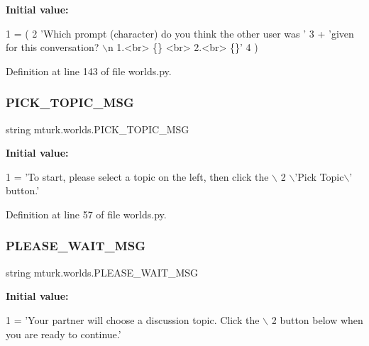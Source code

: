 {\bfseries Initial value\+:}
\begin{DoxyCode}
1 =  (
2     \textcolor{stringliteral}{'Which prompt (character) do you think the other user was '}
3     + \textcolor{stringliteral}{'given for this conversation?  \(\backslash\)n 1.<br> \{\} <br> 2.<br> \{\}'}
4 )
\end{DoxyCode}


Definition at line 143 of file worlds.\+py.

\mbox{\label{namespacemturk_1_1worlds_ad072e1ee295d56a091eba0eac5213c94}} 
\subsubsection{\texorpdfstring{P\+I\+C\+K\+\_\+\+T\+O\+P\+I\+C\+\_\+\+M\+SG}{PICK\_TOPIC\_MSG}}
{\footnotesize\ttfamily string mturk.\+worlds.\+P\+I\+C\+K\+\_\+\+T\+O\+P\+I\+C\+\_\+\+M\+SG}

{\bfseries Initial value\+:}
\begin{DoxyCode}
1 =  \textcolor{stringliteral}{'To start, please select a topic on the left, then click the \(\backslash\)}
2 \textcolor{stringliteral}{    \(\backslash\)'Pick Topic\(\backslash\)' button.'}
\end{DoxyCode}


Definition at line 57 of file worlds.\+py.

\mbox{\label{namespacemturk_1_1worlds_a633a63e2f5ae5198f48f008494263457}} 
\subsubsection{\texorpdfstring{P\+L\+E\+A\+S\+E\+\_\+\+W\+A\+I\+T\+\_\+\+M\+SG}{PLEASE\_WAIT\_MSG}}
{\footnotesize\ttfamily string mturk.\+worlds.\+P\+L\+E\+A\+S\+E\+\_\+\+W\+A\+I\+T\+\_\+\+M\+SG}

{\bfseries Initial value\+:}
\begin{DoxyCode}
1 =  \textcolor{stringliteral}{'Your partner will choose a discussion topic. Click the \(\backslash\)}
2 \textcolor{stringliteral}{    button below when you are ready to continue.'}
\end{DoxyCode}


